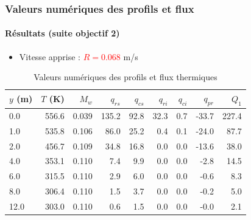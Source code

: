 \documentclass[handout]{beamer}
\newtheorem{pbm et hypo}[thm]{Problématique et hypothèses}
\begin{document}
	
	\begin{frame}
		\frametitle{\textbf{Valeurs numériques des profils et flux}}
		\framesubtitle{\textbf{Résultats (suite objectif 2)}}
		\begin{itemize}
			\item Vitesse apprise : \textcolor{red}{$R = 0.068$} m/s
		\end{itemize}
		
\begin{center}
	\begin{table}[h]
		\footnotesize
		\caption{Valeurs numériques des profils et flux thermiques}
		\begin{tabular}{@{}l*{8}{r}@{}}
			\toprule
			\rowcolor{blue!10}
			$y$ (m) & $T$ (K) & $M_w$ & $q_{rs}$ & $q_{cs}$ & $q_{ri}$ & $q_{ci}$ & $q_{pr}$ & $Q_1$ \\
			\midrule
			\rowcolor{red!5}
			0.0  & 556.6 & 0.039 & 135.2 & 92.8 & 32.3 & 0.7 & -33.7 & 227.4 \\
			\rowcolor{blue!5}
			1.0  & 535.8 & 0.106 & 86.0 & 25.2 & 0.4 & 0.1 & -24.0 & 87.7 \\
			\rowcolor{red!5}
			2.0  & 456.7 & 0.109 & 34.8 & 16.8 & 0.0 & 0.0 & -13.6 & 38.0 \\
			\rowcolor{yellow!15} %
			4.0  & 353.1 & 0.110 & 7.4 & 9.9 & 0.0 & 0.0 & -2.8 & 14.5 \\
			\rowcolor{red!5}
			6.0  & 315.5 & 0.110 & 2.9 & 6.0 & 0.0 & 0.0 & -0.6 & 8.3 \\
			\rowcolor{blue!5}
			8.0  & 306.4 & 0.110 & 1.5 & 3.7 & 0.0 & 0.0 & -0.2 & 5.0 \\
			\rowcolor{red!5}
			12.0 & 303.0 & 0.110 & 0.6 & 1.5 & 0.0 & 0.0 & -0.0 & 2.1 \\
			\bottomrule
		\end{tabular}
	\end{table}
\end{center}
	\end{frame}
\end{document}
